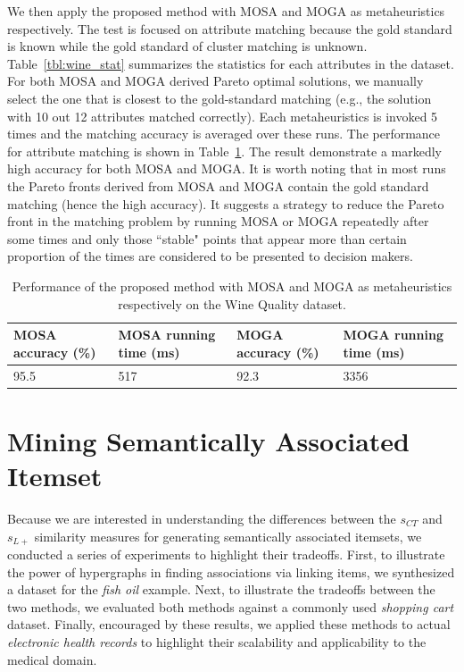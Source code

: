 We then apply the proposed method with MOSA and MOGA as metaheuristics respectively. The test is focused on attribute matching because the gold standard is known while the gold standard of cluster matching is unknown. Table~\ref{tbl:wine_stat} summarizes the statistics for each attributes in the dataset. For both MOSA and MOGA derived Pareto optimal solutions, we manually select the one that is closest to the gold-standard matching (e.g., the solution with 10 out 12 attributes matched correctly). Each metaheuristics is invoked 5 times and the matching accuracy is averaged over these runs. The performance for attribute matching is shown in Table~\ref{tbl:wine_res}. The result demonstrate a markedly high accuracy for both MOSA and MOGA. It is worth noting that in most runs the Pareto fronts derived from MOSA and MOGA contain the gold standard matching (hence the high accuracy). It suggests a strategy to reduce the Pareto front in the matching problem by running MOSA or MOGA repeatedly after some times and only those ``stable" points that appear more than certain proportion of the times are considered to be presented to decision makers.

\begin{table}[tbh]
\begin{center}
\begin{tabular}{l|l|l|l}
\hline
MOSA accuracy (\%)	&	MOSA running time (ms)	&	MOGA accuracy (\%)	&	MOGA running time (ms)	\\
\hline
95.5	&	517	&	92.3	&	3356	\\
\hline
\end{tabular}
\end{center}
\caption{\label{tbl:wine_res} Performance of the proposed method with MOSA and MOGA as metaheuristics respectively on the Wine Quality dataset.}
\end{table}


\section{Mining Semantically Associated Itemset}
\label{experiment}
Because we are interested in understanding the differences between the $s_{CT}$ and $s_{L+}$ similarity measures for generating semantically associated itemsets, we conducted a series of experiments to highlight their tradeoffs.  First, to illustrate the power of hypergraphs in finding associations via linking items, we synthesized a dataset for the \emph{fish oil} example.  Next, to illustrate the tradeoffs between the two methods, we evaluated both methods against a commonly used \emph{shopping cart} dataset.  Finally, encouraged by these results, we applied these methods to actual \emph{electronic health records} to highlight their scalability and applicability to the medical domain.

